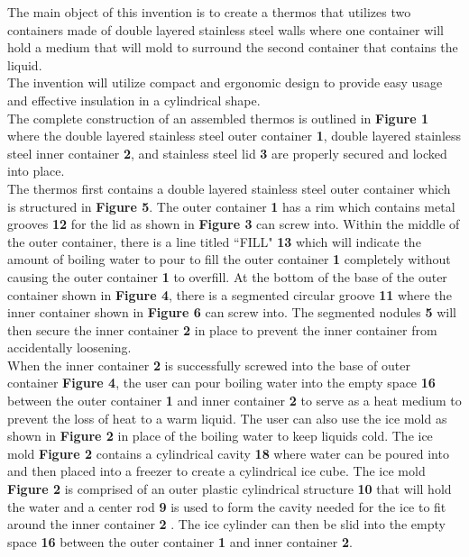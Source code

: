 \documentclass[english]{uspatent}
\begin{document}
\hspace*{0.5cm} The main object of this invention is to create a thermos that utilizes two containers made of double layered stainless steel walls where one container will hold a medium that will mold to surround the second container that contains the liquid.
\\
\hspace*{0.5cm} The invention will utilize compact and ergonomic design to provide easy usage and effective insulation in a cylindrical shape.
\\
\hspace*{0.5cm} The complete construction of an assembled thermos is outlined in \textbf{Figure 1} where the double layered stainless steel outer container \textbf{1}, double layered stainless steel inner container \textbf{2}, and stainless steel lid \textbf{3} are properly secured and locked into place.
\\
\hspace*{0.5cm} The thermos first contains a double layered stainless steel outer container which is structured in \textbf{Figure 5}. The outer container \textbf{1} has a rim which contains metal grooves \textbf{12} for the lid as shown in \textbf{Figure 3} can screw into. Within the middle of the outer container, there is a line titled ``FILL" \textbf{13} which will indicate the amount of boiling water to pour to fill the outer container \textbf{1} completely without causing the outer container \textbf{1} to overfill. At the bottom of the base of the outer container shown in \textbf{Figure 4}, there is a segmented circular groove \textbf{11} where the inner container shown in \textbf{Figure 6} can screw into. The segmented nodules \textbf{5} will then secure the inner container \textbf{2} in place to prevent the inner container from accidentally loosening.
\\
\hspace*{0.5cm} When the inner container \textbf{2} is successfully screwed into the base of outer container \textbf{Figure 4}, the user can pour boiling water into the empty space \textbf{16} between the outer container \textbf{1} and inner container \textbf{2} to serve as a heat medium to prevent the loss of heat to a warm liquid.  The user can also use the ice mold as shown in \textbf{Figure 2} in place of the boiling water to keep liquids cold. The ice mold \textbf{Figure 2} contains a cylindrical cavity \textbf{18} where water can be poured into and then placed into a freezer to create a cylindrical ice cube. The ice mold \textbf{Figure 2} is comprised of an outer plastic cylindrical structure \textbf{10}  that will hold the water and a center rod \textbf{9} is used to form the cavity needed for the ice to fit around the inner container \textbf{2} . The ice cylinder can then be slid into the empty space \textbf{16} between the outer container \textbf{1} and inner container \textbf{2}.
\end{document}
